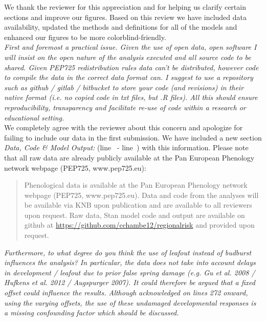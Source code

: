 \documentclass[11pt,a4paper]{article}\usepackage[]{graphicx}\usepackage[]{color}
\newcommand{\lr}[1]{line~\lineref{#1}}
\begin{document}
We thank the reviewer for this appreciation and for helping us clarify certain sections and improve our figures. Based on this review we have included data availability, updated the methods and definitions for all of the models and enhanced our figures to be more colorblind-friendly.  \\

\textit{First and foremost a practical issue. Given the use of open data, open software I will insist on the open nature of the analysis executed and all source code to be shared. Given PEP725 redistribution rules data can't be distributed, however code to compile the data in the correct data format can. I suggest to use a repository such as github / gitlab / bitbucket to store your code (and revisions) in their native format (i.e. no copied code in txt files, but .R files). All this should ensure reproducibility, transparency and facilitate re-use of code within a research or educational setting.} \\

We completely agree with the reviewer about this concern and apologize for failing to include our data in the first submission. We have included a new section \textit{Data, Code \& Model Output:} (\lr{R2data} - \lr{R2dataend}) with this information. Please note that all raw data are already publicly available at the Pan European Phenology network webpage (PEP725, www.pep725.eu): \\

\begin{quotation}
\noindent  Phenological data is available at the Pan European Phenology network webpage (PEP725, www.pep725.eu). Data and code from the analyses will be available via KNB upon publication and are available to all reviewers upon request. Raw data, {Stan} model code and output are available on github at \url{https://github.com/cchambe12/regionalrisk} and provided upon request.
\end{quotation}

\textit{Furthermore, to what degree do you think the use of leafout instead of budburst influences the analysis? In particular, the data does not take into account delays in development / leafout due to prior false spring damage (e.g. Gu et al. 2008 / Hufkens et al. 2012 / Augspurger 2007). It could therefore be argued that a fixed offset could influence the results. Although acknowledged on lines 272 onward, using the varying offsets, the use of these undamaged developmental responses is a missing confounding factor which should be discussed.} \\
\end{document}
